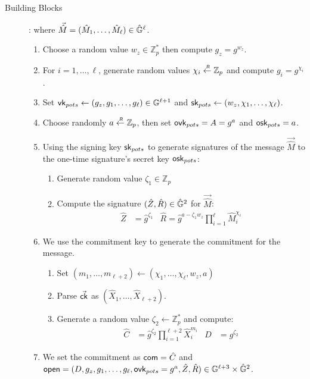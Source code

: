 \begin{subsection}{Building Blocks}
\begin{description}
  \item[]: where $\vec{\hat{M}} = (\hat{M}_1, \dots, \hat{M}_\ell) \in \hat{\mathbb{G}}^\ell$.
    \begin{enumerate}
    \item Choose a random value $w_z \in \mathbb{Z}_p^*$ then compute $g_z = g^{w_z}$.
    \item For $i = 1, \dots, \ell$, generate random values $\chi_i \stackrel{{\scriptscriptstyle \mkern4mu R}}{\gets} \mathbb{Z}_p$ and compute $g_i = g^{\chi_i}$.
    \item Set $\mathsf{vk}_{pots} \gets (g_z, g_1, \dots, g_\ell) \in \mathbb{G}^{\ell+1}$ and $\mathsf{sk}_{pots} \gets (w_z,\chi_1, \dots, \chi_\ell)$.
    \item Choose randomly $a \stackrel{{\scriptscriptstyle \mkern4mu R}}{\gets} \mathbb{Z}_p$, then set $\mathsf{ovk}_{pots} =A = g^{a}$ and $\mathsf{osk}_{pots} = a$.
    \item Using the signing key $\mathsf{sk}_{pots}$ to generate signatures of the message $\vec{\hat{M}}$ \wrt to the one-time signature's secret key $\mathsf{osk}_{pots}$:
      \begin{enumerate}
      \item Generate random value $\zeta_1 \in \mathbb{Z}_p$
      \item Compute the signature $(\hat{Z}, \hat{R}) \in \hat{\mathbb{G}}^2$ for $\vec{\hat{M}}$:
	\begin{align*}
	  \hat{Z} &= \hat{g}^{\zeta_1} & \hat{R} = \hat{g}^{a-\zeta_1 w_z}\prod_{i=1}^{\ell} \hat{M}_i^{\chi_i} 
	\end{align*}
      \end{enumerate}
    \item We use the commitment key to generate the commitment for the message.
      \begin{enumerate}
      \item Set $(m_1, \dots, m_{\ell+2}) \gets (\chi_1, \dots, \chi_\ell, w_z, a)$ 
      \item Parse $\vec{\mathsf{ck}}$ as $(\hat{X}_1, \dots, \hat{X}_{\ell+2})$.
      \item Generate a random value $\zeta_2 \gets \mathbb{Z}_p^*$ and compute:
	\begin{align*}
	  \hat{C} &= \hat{g}^{\zeta_2}\prod_{i = 1}^{\ell+2}\hat{X}_i^{m_i} & D &= g^{\zeta_2}
	\end{align*}
      \end{enumerate}
    \item We set the commitment as $\mathsf{com}  = \hat{C}$ and $\mathsf{open} = (D, g_z, g_1, \dots, g_\ell, \mathsf{ovk}_{pots} = g^a, \hat{Z}, \hat{R}) \in \mathbb{G}^{\ell+3} \times \hat{\mathbb{G}}^{2}$.
    \end{enumerate}
    

\end{description}
\end{subsection}
